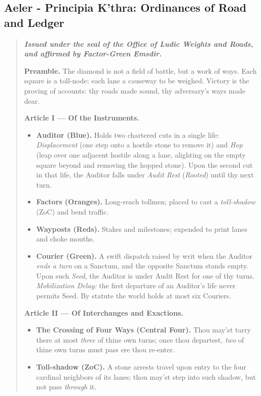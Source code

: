 \documentclass[11pt]{article}
\begin{document}
\subsection{Aeler - Principia K’thra: Ordinances of Road and Ledger}
\begin{quote}\small\itshape
\textbf{Issued under the seal of the Office of Ludic Weights and Roads, and affirmed by Factor-Green Emsdir.}

\medskip
\textbf{Preamble.} The diamond is not a field of battle, but a work of ways. Each square is a toll-node; each lane a causeway to be weighed. Victory is the proving of accounts: thy roads made sound, thy adversary’s ways made dear.

\medskip
\textbf{Article I — Of the Instruments.}
\begin{itemize}\itemsep0.25em
  \item \textbf{Auditor (Blue).} Holds two chartered cuts in a single life: \emph{Displacement} (one step onto a hostile stone to remove it) and \emph{Hop} (leap over one adjacent hostile along a lane, alighting on the empty square beyond and removing the hopped stone). Upon the second cut in that life, the Auditor falls under \emph{Audit Rest} (\emph{Rooted}) until thy next turn.
  \item \textbf{Factors (Oranges).} Long-reach tollmen; placed to cast a \emph{toll-shadow} (ZoC) and bend traffic.
  \item \textbf{Wayposts (Reds).} Stakes and milestones; expended to print lanes and choke mouths.
  \item \textbf{Courier (Green).} A swift dispatch raised by writ when the Auditor \emph{ends a turn} on a Sanctum, and the opposite Sanctum stands empty. Upon such \emph{Seed}, the Auditor is under Audit Rest for one of thy turns. \emph{Mobilization Delay:} the first departure of an Auditor’s life never permits Seed. By statute the world holds at most six Couriers.
\end{itemize}

\textbf{Article II — Of Interchanges and Exactions.}
\begin{itemize}\itemsep0.25em
  \item \textbf{The Crossing of Four Ways (Central Four).} Thou may’st tarry there at most \emph{three} of thine own turns; once thou departest, \emph{two} of thine own turns must pass ere thou re-enter.
  \item \textbf{Toll-shadow (ZoC).} A stone arrests travel upon entry to the four cardinal neighbors of its lanes; thou may’st step into such shadow, but not pass \emph{through} it.
\end{itemize}


\end{quote}
\end{document}
